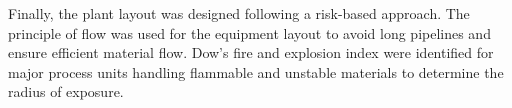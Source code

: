 Finally, the plant layout was designed following a risk-based approach. The principle of flow was used for the equipment layout to avoid long pipelines and ensure efficient material flow. Dow’s fire and explosion index were identified for major process units handling flammable and unstable materials to determine the radius of exposure.  